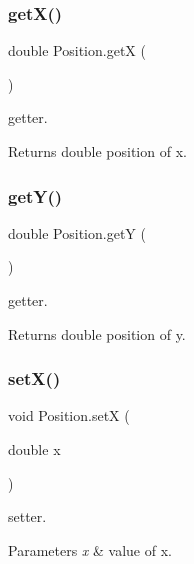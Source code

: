 \subsubsection{\texorpdfstring{get\+X()}{getX()}}
{\footnotesize\ttfamily double Position.\+getX (\begin{DoxyParamCaption}{ }\end{DoxyParamCaption})\hspace{0.3cm}{\ttfamily [inline]}}

getter. \begin{DoxyReturn}{Returns}
double position of x. 
\end{DoxyReturn}
\mbox{\label{class_position_acc59fee4dda06e7be2455916abe6a2a6}} 
\subsubsection{\texorpdfstring{get\+Y()}{getY()}}
{\footnotesize\ttfamily double Position.\+getY (\begin{DoxyParamCaption}{ }\end{DoxyParamCaption})\hspace{0.3cm}{\ttfamily [inline]}}

getter. \begin{DoxyReturn}{Returns}
double position of y. 
\end{DoxyReturn}
\mbox{\label{class_position_a30f78db92c43f742e7108972be6de018}} 
\subsubsection{\texorpdfstring{set\+X()}{setX()}}
{\footnotesize\ttfamily void Position.\+setX (\begin{DoxyParamCaption}\item[{double}]{x }\end{DoxyParamCaption})\hspace{0.3cm}{\ttfamily [inline]}}

setter. 
\begin{DoxyParams}{Parameters}
{\em x} & value of x. \\
\hline
\end{DoxyParams}
\mbox{\label{class_position_aaf877e0285431a70b8a254ae14bf022e}} 
